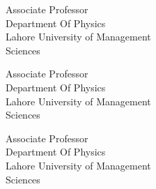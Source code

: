\begin{minipage}{0.3333\linewidth}
Associate Professor\\
Department Of Physics\\
Lahore University of Management \\Sciences
\end{minipage}%
\begin{minipage}{0.3333\linewidth}
Associate Professor\\
Department Of Physics\\
Lahore University of Management \\Sciences
\end{minipage}%
\begin{minipage}{0.3333\linewidth}
Associate Professor\\
Department Of Physics\\
Lahore University of Management \\Sciences
\end{minipage}